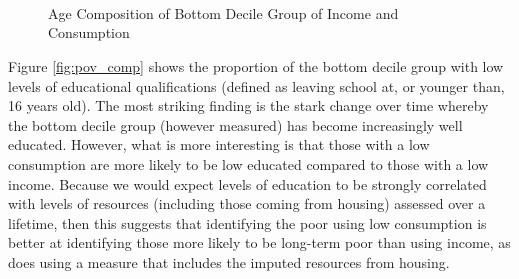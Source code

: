 \begin{figure}
\caption{Age Composition of Bottom Decile Group of Income and Consumption}
\centering
	 \\
	 \\
	 \\
\label{fig:age_comp}
\end{figure}

Figure \ref{fig:pov_comp} shows the proportion of the bottom decile group with low levels of educational qualifications (defined as leaving school at, or younger than, 16 years old). The most striking finding is the stark change over time whereby the bottom decile group (however measured) has become increasingly well educated. However, what is more interesting is that those with a low consumption are more likely to be low educated compared to those with a low income. Because we would expect levels of education to be strongly correlated with levels of resources (including those coming from housing) assessed over a lifetime, then this suggests that identifying the poor using low consumption is better at identifying those more likely to be long-term poor than using income, as does using a measure that includes the imputed resources from housing.

